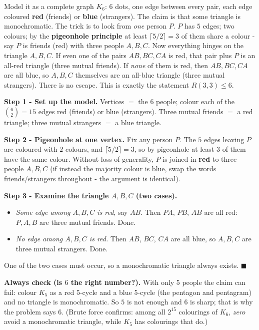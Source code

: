 \documentclass[11pt,a4paper]{article}
\begin{document}
\begin{ideabox}
Model it as a complete graph $K_6$: $6$ dots, one edge between every pair, each edge coloured
\textbf{red} (friends) or \textbf{blue} (strangers). The claim is that some triangle is
monochromatic. The trick is to look from \emph{one} person $P$. $P$ has $5$ edges; two colours;
by the \textbf{pigeonhole principle} at least $\lceil 5/2\rceil = 3$ of them share a colour - say
$P$ is friends (red) with three people $A,B,C$. Now everything hinges on the triangle $A,B,C$.
If even one of the pairs $AB,BC,CA$ is red, that pair plus $P$ is an all-red triangle (three mutual
friends). If \emph{none} of them is red, then $AB,BC,CA$ are all blue, so $A,B,C$ themselves are an
all-blue triangle (three mutual strangers). There is no escape. This is exactly the statement
$R(3,3)\le 6$.
\end{ideabox}

\textbf{Step 1 - Set up the model.}
Vertices $=$ the $6$ people; colour each of the $\binom{6}{2}=15$ edges red (friends) or blue
(strangers). \textquotedbl{}Three mutual friends\textquotedbl{} $=$ a red triangle; \textquotedbl{}three
mutual strangers\textquotedbl{} $=$ a blue triangle.

\textbf{Step 2 - Pigeonhole at one vertex.}
Fix any person $P$. The $5$ edges leaving $P$ are coloured with $2$ colours, and
$\lceil 5/2\rceil=3$, so by pigeonhole at least $3$ of them have the same colour. Without loss of
generality, $P$ is joined in \textbf{red} to three people $A,B,C$ (if instead the majority colour
is blue, swap the words \textquotedbl{}friends\textquotedbl{}/\textquotedbl{}strangers\textquotedbl{}
throughout - the argument is identical).

\textbf{Step 3 - Examine the triangle $A,B,C$ (two cases).}
\begin{itemize}[leftmargin=1.3em,topsep=2pt]
\item \emph{Some edge among $A,B,C$ is red}, say $AB$. Then $P\!A$, $P\!B$, $AB$ are all red:
$P,A,B$ are three mutual friends. Done.
\item \emph{No edge among $A,B,C$ is red.} Then $AB$, $BC$, $CA$ are all blue, so $A,B,C$ are
three mutual strangers. Done.
\end{itemize}
One of the two cases must occur, so a monochromatic triangle always exists. $\blacksquare$

\textbf{Always check (is $6$ the right number?).} With only $5$ people the claim can fail: colour
$K_5$ as a red $5$-cycle and a blue $5$-cycle (the \textquotedbl{}pentagon and
pentagram\textquotedbl{}) and no triangle is monochromatic. So $5$ is not enough and $6$ is sharp;
that is why the problem says $6$. (Brute force confirms: among all $2^{15}$ colourings of $K_6$,
\emph{zero} avoid a monochromatic triangle, while $K_5$ has colourings that do.) \checkmark
\end{document}

